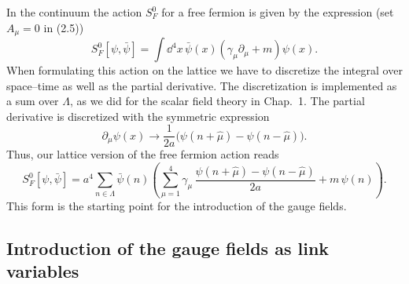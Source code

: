 In the continuum the action $S_F^0$ for a free fermion is given by the
expression (set $A_\mu = 0$ in (2.5))
\begin{equation}
  S_F^0[\psi, \bar\psi] = \int \dd^4 x\,
    \bar\psi(x) (\gamma_\mu \partial_\mu + m) \psi(x) .
\end{equation}
When formulating this action on the lattice we have to discretize the
integral over space--time as well as the partial derivative. The
discretization is implemented as a sum over $\Lambda$, as we did for the
scalar field theory in Chap.~1. The partial derivative is discretized with
the symmetric expression
\begin{equation}
  \partial_\mu \psi(x) \to
    \frac{1}{2a}\big(\psi(n + \hat\mu) - \psi(n - \hat\mu)\big) .
\end{equation}
Thus, our lattice version of the free fermion action reads
\begin{equation}
  S_F^0[\psi, \bar\psi] = a^4 \sum_{n\in\Lambda}
    \bar\psi(n) \left( \sum_{\mu=1}^{4} \gamma_\mu\,
      \frac{\psi(n + \hat\mu) - \psi(n - \hat\mu)}{2a} + m\,\psi(n) \right) .
\end{equation}
This form is the starting point for the introduction of the gauge fields.

\subsection{Introduction of the gauge fields as link variables}

